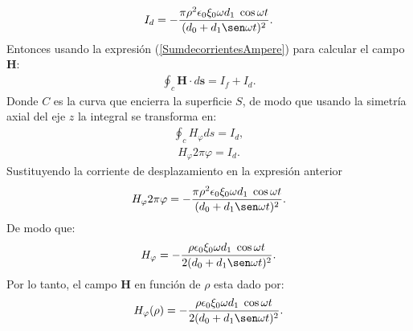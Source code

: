 \documentclass[11pt,fleqn]{book} %
\begin{document}
\begin{example}
\begin{eqnarray*}
\end{eqnarray*}
\begin{equation}
I_{d}=-\frac{\pi\rho^{2} \epsilon_{0}\xi_{0}\omega d_{1} \hspace{1mm} \cos \omega t }{(d_{0}+d_{1}\sen\omega t)^{2}}.
\end{equation}
Entonces usando la expresi\'on (\ref{SumdecorrientesAmpere}) para calcular el campo $\textbf{H}$:
\begin{eqnarray*}
\oint_{c} \textbf{H} \cdot d\textbf{s}=I_{f}+I_{d}.
\end{eqnarray*}
Donde $C$ es la curva que encierra la superficie $S$, de modo que usando la simetr\'ia axial del eje $z$ la integral se transforma en:
\begin{eqnarray*}
\oint_{c} H_{\varphi} ds=I_{d},
\end{eqnarray*}
\begin{eqnarray*}
H_{\varphi} 2\pi\varphi=I_{d}.
\end{eqnarray*}
Sustituyendo la corriente de desplazamiento en la expresi\'on anterior
\begin{equation}
H_{\varphi} 2\pi\varphi=-\frac{\pi\rho^{2} \epsilon_{0}\xi_{0}\omega d_{1} \hspace{1mm} \cos \omega t }{(d_{0}+d_{1}\sen\omega t)^{2}}.
\end{equation}
De modo que:
\begin{equation}
H_{\varphi} =-\frac{\rho \epsilon_{0}\xi_{0}\omega d_{1} \hspace{1mm} \cos \omega t }{2(d_{0}+d_{1}\sen\omega t)^{2}}.
\end{equation}
Por lo tanto, el campo $\textbf{H}$ en funci\'on de $\rho$ esta dado por:
\begin{equation}
H_{\varphi} (\rho) =-\frac{\rho \epsilon_{0}\xi_{0}\omega d_{1} \hspace{1mm} \cos \omega t }{2(d_{0}+d_{1}\sen\omega t)^{2}}.
\end{equation}
\end{example}

\end{document}
